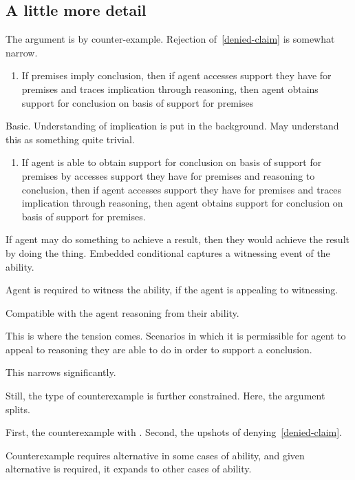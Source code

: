 \documentclass[10pt]{article}
\begin{document}
\subsection{A little more detail}
\label{sec:little-more-detail}

The argument is by counter-example.
Rejection of~\ref{denied-claim} is somewhat narrow.



\begin{enumerate}[]
\item\label{access} If premises imply conclusion, then if agent accesses support they have for premises and traces implication through reasoning, then agent obtains support for conclusion on basis of support for premises
\end{enumerate}

Basic.
Understanding of implication is put in the background.
May understand this as something quite trivial.

\begin{enumerate}[]
\item\label{access} If agent is able to obtain support for conclusion on basis of support for premises by accesses support they have for premises and reasoning to conclusion, then if agent accesses support they have for premises and traces implication through reasoning, then agent obtains support for conclusion on basis of support for premises.
\end{enumerate}

If agent may do something to achieve a result, then they would achieve the result by doing the thing.
Embedded conditional captures a witnessing event of the ability.

Agent is required to witness the ability, if the agent is appealing to witnessing.

Compatible with the agent reasoning from their ability.

This is where the tension comes.
Scenarios in which it is permissible for agent to appeal to reasoning they are able to do in order to support a conclusion.

This narrows significantly.

Still, the type of counterexample is further constrained.
Here, the argument splits.

First, the counterexample with \nI{}.
Second, the upshots of denying~\ref{denied-claim}.

Counterexample requires alternative in some cases of ability, and given alternative is required, it expands to other cases of ability.
\end{document}
